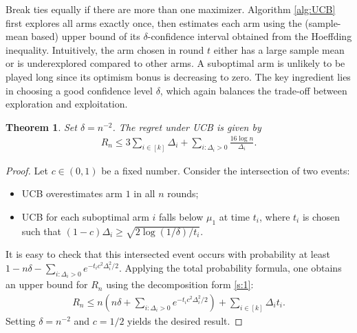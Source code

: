 \documentclass[10pt,a4paper]{amsart}
\numberwithin{equation}{section}
\theoremstyle{plain}
\newtheorem{Th}{Theorem}
\theoremstyle{definition}
\begin{document}
Break ties equally if there are more than one maximizer. Algorithm \ref{alg:UCB} first explores all arms exactly once, then estimates each arm using the (sample-mean based) upper bound of its $\delta$-confidence interval obtained from the Hoeffding inequality. Intuitively, the arm chosen in round $t$ either has a large sample mean or is underexplored compared to other arms. A suboptimal arm is unlikely to be played long since its optimism bonus is decreasing to zero. The key ingredient lies in choosing a good confidence level $\delta$, which again balances the trade-off between exploration and exploitation.  
\begin{Th}\label{thm:UCB}
Set $\delta=n^{-2}$. The regret under UCB is given by
\begin{align*}
R_n\leq 3\sum_{i\in [k]}\Delta_i +\sum_{i: \Delta_i>0}\frac{16\log n}{\Delta_i}.
\end{align*}
\end{Th}
\begin{proof}
Let $c\in (0,1)$ be a fixed number. Consider the intersection of two events: 
\begin{itemize}
\item UCB overestimates arm $1$ in all $n$ rounds; 
\item UCB for each suboptimal arm $i$ falls below $\mu_1$ at time $t_i$, where $t_i$ is chosen such that $(1-c)\Delta_i\geq\sqrt{2\log(1/\delta)/t_i}$. 
\end{itemize}
It is easy to check that this intersected event occurs with probability at least $1-n\delta-\sum_{i: \Delta_i>0}e^{-t_ic^2\Delta^2_i/2}$. Applying the total probability formula, one obtains an upper bound for $R_n$ using the decomposition form \eqref{s:1}:
\begin{align*}
R_n\leq n\left(n\delta+\sum_{i: \Delta_i>0}e^{-t_ic^2\Delta^2_i/2}\right)+\sum_{i\in [k]}\Delta_i t_i.
\end{align*}
Setting $\delta=n^{-2}$ and $c=1/2$ yields the desired result.   
\end{proof}
\end{document}
